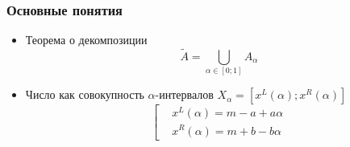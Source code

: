 \documentclass[12pt]{beamer}
\begin{document}
\begin{frame}
  \frametitle{Основные понятия}
  \begin{itemize}
    \item Теорема о декомпозиции 
      \begin{equation}
        \tilde{A}=\bigcup\limits_{\alpha \in \left[ 0;1 \right]}{A_\alpha}
      \end{equation}
    \item Число как совокупность $\alpha$-интервалов $X_\alpha = \left[x^L(\alpha); x^R(\alpha) \right]$
      \begin{equation}
        \left[ 
          \begin{aligned}
            & x^L(\alpha )=m-a+a\alpha  \\ 
            & x^R(\alpha )=m+b-b\alpha
          \end{aligned}
        \right.
      \end{equation}
  \end{itemize}
\end{frame}
\end{document}
